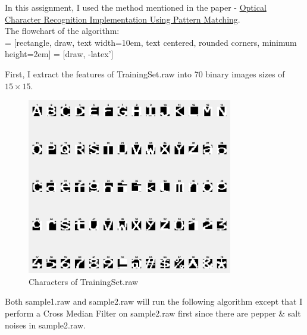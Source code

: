 \documentclass{article}
\begin{document}
In this assignment, I used the method mentioned in the paper - \href{http://ijcsit.com/docs/Volume\%205/vol5issue02/ijcsit20140502254.pdf}{Optical Character Recognition Implementation Using Pattern Matching}. \\

The flowchart of the algorithm: \\

 = [rectangle, draw, text width=10em, text centered, rounded corners, minimum height=2em]
 = [draw, -latex']
\begin{center}
\end{center}

First, I extract the features of TrainingSet.raw into 70 binary images sizes of $15 \times 15$.

\begin{figure}[!htb]
    \centering
    \includegraphics[width=0.8\textwidth]{img/chars.png}
    \caption{Characters of TrainingSet.raw}
\end{figure}

Both sample1.raw and sample2.raw will run the following algorithm except that I perform a Cross Median Filter on sample2.raw first since there are pepper \& salt noises in sample2.raw.
\end{document}
